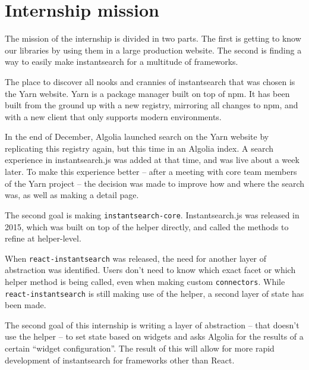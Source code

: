 
\chapter{Internship mission} %
\label{chp:mission}

The mission of the internship is divided in two parts. The first is getting to know our libraries by using them in a large production website. The second is finding a way to easily make instantsearch for a multitude of frameworks.

The place to discover all nooks and crannies of instantsearch that was chosen is the Yarn website\cite{yarn-site}. Yarn is a package manager built on top of npm\cite{npm-github}. It has been built from the ground up with a new registry, mirroring all changes to npm, and with a new client that only supports modern environments.

In the end of December, Algolia launched search on the Yarn website by replicating this registry again, but this time in an Algolia index. A search experience in instantsearch.js was added\cite{yarn-pr-add-algolia} at that time, and was live about a week later. To make this experience better -- after a meeting with core team members of the Yarn project -- the decision was made to improve how and where the search was, as well as making a detail page.

The second goal is making {\tt instantsearch-core}. Instantsearch.js was released in 2015, which was built on top of the helper\cite{algolia-js-helper} directly, and called the methods to refine at helper-level.

When {\tt react-instantsearch}\cite{react-instantsearch} was released, the need for another layer of abstraction was identified. Users don't need to know which exact facet or which helper method is being called, even when making custom {\tt connectors}\cite{react-instantsearch-connectors}. While {\tt react-instantsearch} is still making use of the helper, a second layer\cite{react-instantsearch-search-state} of state has been made.

The second goal of this internship is writing a layer of abstraction -- that doesn't use the helper -- to set state based on widgets and asks Algolia for the results of a certain ``widget configuration''. The result of this will allow for more rapid development of instantsearch for frameworks other than React.
